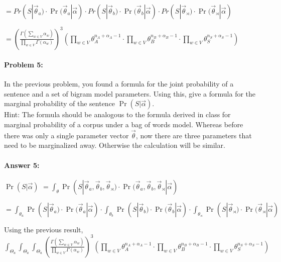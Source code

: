 \documentclass[10pt]{article}
\begin{document}
    $=Pr(S | \vec{\theta}_{a})\cdot{\Pr(\vec{\theta}_{a}}|\vec{\alpha})\cdot{Pr(S | \vec{\theta}_{b})\cdot{\Pr(\vec{\theta}_{b}}|\vec{\alpha})\cdot{Pr(S | \vec{\theta}_{\rtimes})\cdot{\Pr(\vec{\theta}_{\rtimes}}|\vec{\alpha})}}$
    
    $=\left(\frac{\Gamma(\sum_{w \in V} \alpha_{w})}{\prod_{w \in V} \Gamma(\alpha_{w})}\right)^3 \left(\prod_{w \in V} \theta_{A}^{n_A+\alpha_{A}-1}\cdot{\prod_{w \in V} \theta_{B}^{n_B+\alpha_{B}-1}\cdot{\prod_{w \in V} \theta_{S}^{n_S+\alpha_{S}-1}}}\right)$


\noindent\hrulefill %

\paragraph{Problem 5:}

In the previous problem, you found a formula for the joint probability
of a sentence and a set of bigram model parameters. Using this, give a
formula for the marginal probability of the sentence
$\Pr(S|\vec{\alpha})$.\\

\noindent Hint: The formula should be analogous to the formula derived
in class for marginal probability of a corpus under a bag of words
model. Whereas before there was only a single parameter vector
$\vec{\theta}$, now there are three parameters that need to be
marginalized away. Otherwise the calculation will be similar.

\paragraph{Answer 5:} 
$\Pr(S|\vec{\alpha})$
$=\int_{\theta} \Pr(S | \vec{\theta}_{a}, \vec{\theta}_{b}, \vec{\theta}_{\rtimes})\cdot{\Pr(\vec{\theta}_{a}}, \vec{\theta}_{b}, \vec{\theta}_{\rtimes}|\vec{\alpha})$

$=\int_{\theta_{a}} \Pr(S | \vec{\theta}_{a})\cdot{\Pr(\vec{\theta}_{a}}|\vec{\alpha})\cdot{\int_{\theta_{b}} \Pr(S | \vec{\theta}_{b})\cdot{\Pr(\vec{\theta}_{b}}|\vec{\alpha})\cdot{\int_{\theta_{\rtimes}} \Pr(S | \vec{\theta}_{\rtimes})\cdot{\Pr(\vec{\theta}_{\rtimes}}|\vec{\alpha})}}$

Using the previous result, $\int_{\Theta_a}\int_{\Theta_a}\int_{\Theta_a}\left(\frac{\Gamma(\sum_{w \in V} \alpha_{w})}{\prod_{w \in V} \Gamma(\alpha_{w})}\right)^3 \left(\prod_{w \in V} \theta_{A}^{n_A+\alpha_{A}-1}\cdot{\prod_{w \in V} \theta_{B}^{n_B+\alpha_{B}-1}\cdot{\prod_{w \in V} \theta_{S}^{n_S+\alpha_{S}-1}}}\right)$
\end{document}
